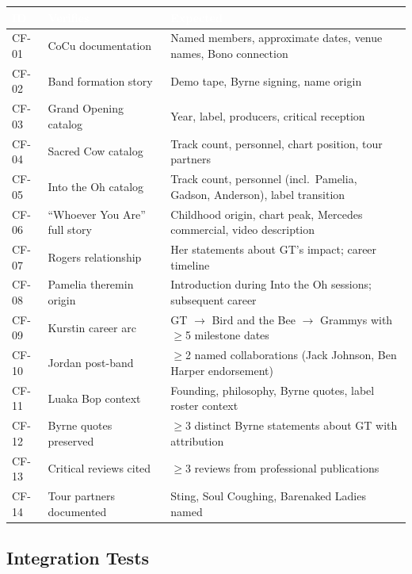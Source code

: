 \documentclass[11pt,letterpaper]{article}
\newcommand{\tableheader}[1]{\textbf{\sffamily\textcolor{white}{#1}}}
\begin{document}
\begin{center}
\begin{tabularx}{\textwidth}{C{1.2cm}L{3.5cm}X}
\toprule
{}
\tableheader{ID} & \tableheader{Verifies} & \tableheader{Expected} \\
\midrule
CF-01 & CoCu documentation & Named members, approximate dates, venue names, Bono connection \\
CF-02 & Band formation story & Demo tape, Byrne signing, name origin \\
CF-03 & Grand Opening catalog & Year, label, producers, critical reception \\
CF-04 & Sacred Cow catalog & Track count, personnel, chart position, tour partners \\
CF-05 & Into the Oh catalog & Track count, personnel (incl.\ Pamelia, Gadson, Anderson), label transition \\
CF-06 & ``Whoever You Are'' full story & Childhood origin, chart peak, Mercedes commercial, video description \\
CF-07 & Rogers relationship & Her statements about GT's impact; career timeline \\
CF-08 & Pamelia theremin origin & Introduction during Into the Oh sessions; subsequent career \\
CF-09 & Kurstin career arc & GT $\rightarrow$ Bird and the Bee $\rightarrow$ Grammys with $\geq$5 milestone dates \\
CF-10 & Jordan post-band & $\geq$2 named collaborations (Jack Johnson, Ben Harper endorsement) \\
CF-11 & Luaka Bop context & Founding, philosophy, Byrne quotes, label roster context \\
CF-12 & Byrne quotes preserved & $\geq$3 distinct Byrne statements about GT with attribution \\
CF-13 & Critical reviews cited & $\geq$3 reviews from professional publications \\
CF-14 & Tour partners documented & Sting, Soul Coughing, Barenaked Ladies named \\
\bottomrule
\end{tabularx}
\end{center}

\subsection{Integration Tests}
\end{document}
